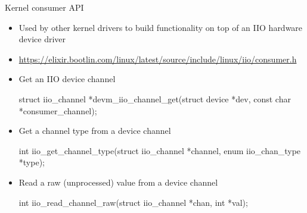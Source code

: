\begin{frame}
   {Kernel consumer API}
	\begin{itemize}
		\item
			Used by other kernel drivers to build functionality on top of an IIO hardware device driver
		\item
			\url{https://elixir.bootlin.com/linux/latest/source/include/linux/iio/consumer.h}
		\item
			Get an IIO device channel
\begin{raw}
struct iio_channel *devm_iio_channel_get(struct device *dev,
					 const char *consumer_channel);
\end{raw}
		\item
			Get a channel type from a device channel
			\begin{raw}
int iio_get_channel_type(struct iio_channel *channel,
			 enum iio_chan_type *type);
			\end{raw}
		\item
			Read a raw (unprocessed) value from a device channel
			\begin{raw}
int iio_read_channel_raw(struct iio_channel *chan,
			 int *val);
			\end{raw}
	\end{itemize}
\end{frame}
